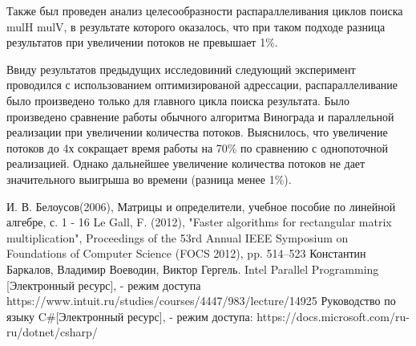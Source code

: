 \documentclass[12pt]{report}
\begin{document}
Также был проведен анализ целесообразности распараллеливания циклов поиска mulH mulV, в результате которого оказалось, что при таком подходе разница результатов при увеличении потоков не превышает 1\%. 

Ввиду результатов предыдущих исследовиний следующий эксперимент проводился с использованием оптимизированой адрессации, распараллеливание было произведено только для главного цикла поиска результата.
Было произведено сравнение работы обычного алгоритма Винограда и параллельной реализации при увеличении количества потоков. Выяснилось, что увеличение потоков до 4х сокращает время работы на 70\% по сравнению с
однопоточной реализацией. Однако дальнейшее увеличение количества потоков не дает значительного выигрыша во времени (разница менее 1\%). 
 \begin{thebibliography}{3}
И. В. Белоусов(2006), Матрицы и определители, учебное пособие по линейной алгебре, с. 1 - 16
Le Gall, F. (2012), "Faster algorithms for rectangular matrix multiplication", Proceedings of the 53rd Annual IEEE Symposium on Foundations of Computer Science (FOCS 2012), pp. 514–523
Константин Баркалов, Владимир Воеводин, Виктор Гергель. Intel Parallel Programming [Электронный ресурс], - режим доступа https://www.intuit.ru/studies/courses/4447/983/lecture/14925
Руководство по языку C\#[Электронный ресурс], - режим доступа: https://docs.microsoft.com/ru-ru/dotnet/csharp/
\end{thebibliography}
\end{document}
